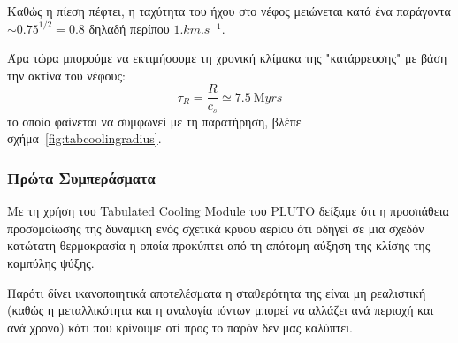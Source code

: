 	Καθώς η πίεση πέφτει, η ταχύτητα του ήχου στο νέφος μειώνεται κατά ένα παράγοντα $\sim 0.75^{1/2}=0.8$ δηλαδή περίπου $1\si{.km.s^{-1}}$.
	
%	
	Άρα τώρα μπορούμε να εκτιμήσουμε τη χρονική κλίμακα της "κατάρρευσης" με βάση την ακτίνα του νέφους:
	\begin{equation}
	\tau_R=\frac{R}{c_s} \simeq \SI{7.5}{\mega yrs}
	\end{equation}
	το οποίο φαίνεται να συμφωνεί με τη παρατήρηση, βλέπε σχήμα~\ref{fig:tabcoolingradius}.
	
	\subsubsection{Πρώτα Συμπεράσματα}
	Με τη χρήση του Tabulated Cooling Module του PLUTO δείξαμε ότι η προσπάθεια προσομοίωσης της δυναμική ενός σχετικά κρύου αερίου ότι οδηγεί σε μια σχεδόν κατώτατη θερμοκρασία η οποία προκύπτει από τη απότομη αύξηση της κλίσης της καμπύλης ψύξης.
	
	Παρότι δίνει ικανοποιητικά αποτελέσματα η σταθερότητα της είναι μη ρεαλιστική (καθώς η μεταλλικότητα και η αναλογία ιόντων μπορεί να αλλάζει ανά περιοχή και ανά χρονο) κάτι που κρίνουμε οτί προς το παρόν δεν μας καλύπτει.
	
%	
%	
%	
%	

